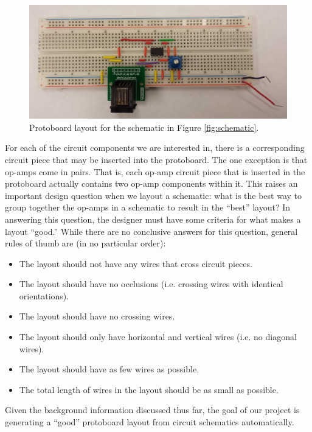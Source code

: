 \begin{figure}
\begin{center}
\includegraphics[width=\textwidth]{Images/sample_physical_layout.jpg}
\caption{Protoboard layout for the schematic in Figure \ref{fig:schematic}.}
\label{fig:eg_s_to_pb}
\end{center}
\end{figure}

For each of the circuit components we are interested in, there is a corresponding
circuit piece that may be inserted into the protoboard. The one exception is that
op-amps come in pairs. That is, each op-amp circuit piece that is inserted in the
protoboard actually contains two op-amp components within it. This raises an
important design question when we layout a schematic: what is the best way to
group together the op-amps in a schematic to result in the ``best'' layout? In
answering this question, the designer must have some criteria for what makes a
layout ``good.'' While there are no conclusive answers for this question,
general rules of thumb are (in no particular order):

\begin{itemize}
\item The layout should not have any wires that cross circuit pieces.
\item The layout should have no occlusions (i.e. crossing wires with identical
orientations).
\item The layout should have no crossing wires.
\item The layout should only have horizontal and vertical wires (i.e. no
diagonal wires).
\item The layout should have as few wires as possible.
\item The total length of wires in the layout should be as small as possible.
\end{itemize}

Given the background information discussed thus far, the goal of our project is
generating a ``good'' protoboard layout from circuit schematics automatically.

